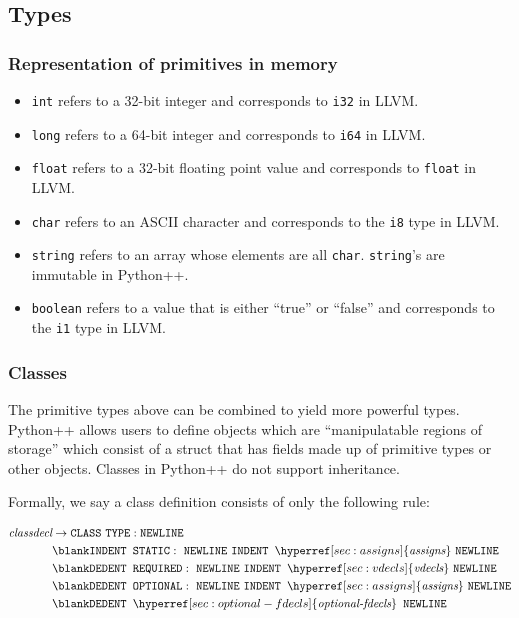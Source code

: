 \documentclass{article}
\begin{document}
\subsection{Types}
\subsubsection{Representation of primitives in memory}
\begin{itemize}
    \item \texttt{int} refers to a 32-bit integer and corresponds to \texttt{i32} in LLVM.
    \item \texttt{long} refers to a 64-bit integer and corresponds to \texttt{i64} in LLVM.
    \item \texttt{float} refers to a 32-bit floating point value and corresponds to \texttt{float} in LLVM.
    \item \texttt{char} refers to an ASCII character and corresponds to the \texttt{i8} type in LLVM.
    \item \texttt{string} refers to an array whose elements are all \texttt{char}. \texttt{string}'s are immutable in Python++.
    \item \texttt{boolean} refers to a value that is either ``true'' or ``false'' and corresponds to the \texttt{i1} type in LLVM.
\end{itemize}

\subsubsection{Classes}
The primitive types above can be combined to yield more powerful types. Python++ allows users to define objects which are ``manipulatable regions of storage'' which consist of a struct that has fields made up of primitive types or other objects. Classes in Python++ do not support inheritance.

Formally, we say a class definition consists of only the following rule:

\label{sec:classdecl}
\begin{align*}
    \textit{classdecl} &\to \texttt{CLASS} \text{ } \texttt{TYPE}: \texttt{NEWLINE} \text{ } \\
    &\blank \texttt{INDENT} \texttt{ } \texttt{STATIC}: \text{ } \texttt{NEWLINE}  \text{ } \texttt{INDENT} \texttt{ } \hyperref[sec:assigns]{\textit{assigns}} \text{ } \texttt{NEWLINE} \text{ } \\
    &\blank
    \texttt{DEDENT} \texttt{ } \texttt{REQUIRED}: \text{ } \texttt{NEWLINE} \text{ } \texttt{INDENT} \texttt{ }  \hyperref[sec:vdecls]{\textit{vdecls}} \text{ } \texttt{NEWLINE} \text{ } \\
    &\blank \texttt{DEDENT} \texttt{ } \texttt{OPTIONAL}: \text{ }  \texttt{NEWLINE} \text{ } \texttt{INDENT} \texttt{ } \hyperref[sec:assigns]{\textit{assigns}} \text{ } \texttt{NEWLINE} \\
    &\blank \texttt{DEDENT} \texttt{ } \hyperref[sec:optional-fdecls]{\textit{optional-fdecls}} \texttt{ } \texttt{NEWLINE}
\end{align*}
\end{document}
